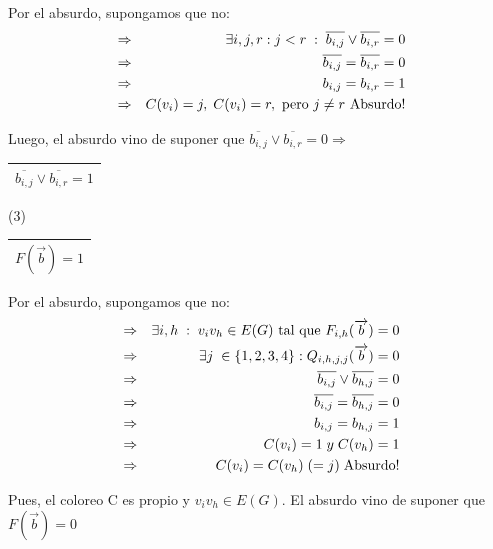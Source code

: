 \documentclass[12pt,a4paper]{report}
\newcounter{neq}
\begin{document}
					\par Por el absurdo, supongamos que no:
					\begin{eqnarray}
						\nonumber &\Rightarrow & \exists i, j, r : j < r \; : \; \overline{b_{i, j}} \vee \overline{b_{i, r}} = 0 \\
						\nonumber &\Rightarrow & \overline{b_{i, j}} = \overline{b_{i, r}} = 0 \\
						\nonumber &\Rightarrow & b_{i, j} = b_{i, r} = 1 \\
						\nonumber &\Rightarrow & C(v_{i}) = j, \; C(v_{i}) = r, \textup{ pero } j \neq r \textup{ Absurdo!}
					\end{eqnarray}
					\par Luego, el absurdo vino de suponer que $\overline{b_{i, j}} \vee \overline{b_{i, r}} = 0 \Rightarrow$ \begin{tabular}{|c|} \hline $\overline{b_{i, j}} \vee \overline{b_{i, r}} = 1$\\ \hline \end{tabular}
				
				\vspace{3mm}
				(3) \begin{tabular}{|c|} \hline $F(\overrightarrow{b}) = 1$ \\ \hline \end{tabular}
				\vspace{3mm}

					\par Por el absurdo, supongamos que no:
					\begin{eqnarray}
						\nonumber &\Rightarrow & \exists i, h \; : \; v_{i} v_{h} \in E(G) \textup{ tal que } F_{i, h}(\overrightarrow{b}) = 0 \\
						\nonumber &\Rightarrow & \exists j \; \in \lbrace 1, 2, 3, 4 \rbrace : Q_{i, h, j, j}(\overrightarrow{b}) = 0 \\
						\nonumber &\Rightarrow & \overline{b_{i, j}} \vee \overline{b_{h, j}} = 0 \\
						\nonumber &\Rightarrow & \overline{b_{i, j}} = \overline{b_{h, j}} = 0 \\
						\nonumber &\Rightarrow & b_{i, j} = b_{h, j} = 1 \\
						\nonumber &\Rightarrow & C(v_{i}) = 1\; y \; C(v_{h}) = 1\\
						\nonumber &\Rightarrow & C(v_{i}) = C(v_{h}) \; (= j) \; \textup{Absurdo!}
					\end{eqnarray}
					\par Pues, el coloreo C es propio y $v_{i} v_{h} \in E(G)$. El absurdo vino de suponer que $F(\overrightarrow{b}) = 0$
\end{document}
